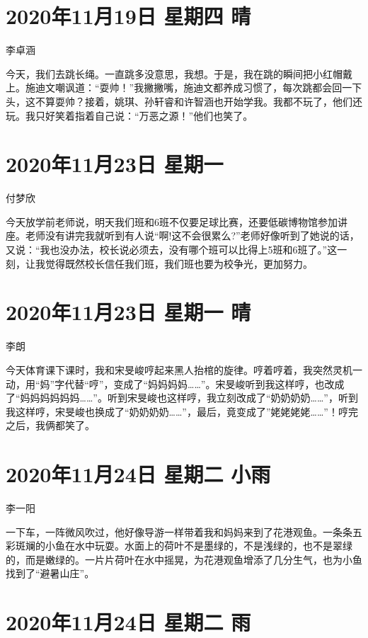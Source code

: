 \section{2020年11月19日 星期四 晴}

李卓涵

今天，我们去跳长绳。一直跳多没意思，我想。于是，我在跳的瞬间把小红帽戴上。施迪文嘲讽道：“耍帅！”我撇撇嘴，施迪文都养成习惯了，每次跳都会回一下头，这不算耍帅？接着，姚琪、孙轩睿和许智涵也开始学我。我都不玩了，他们还玩。我只好笑着指着自己说：“万恶之源！”他们也笑了。

\section{2020年11月23日 星期一}

付梦欣

今天放学前老师说，明天我们班和6班不仅要足球比赛，还要低碳博物馆参加讲座。老师没有讲完我就听到有人说“啊!这不会很累么?”老师好像听到了她说的话，又说：“我也没办法，校长说必须去，没有哪个班可以比得上5班和6班了。”这一刻，让我觉得既然校长信任我们班，我们班也要为校争光，更加努力。

\section{2020年11月23日 星期一 晴}

李朗

今天体育课下课时，我和宋旻峻哼起来黑人抬棺的旋律。哼着哼着，我突然灵机一动，用“妈”字代替“哼”，变成了“妈妈妈妈……”。宋旻峻听到我这样哼，也改成了“妈妈妈妈妈妈……”。听到宋旻峻也这样哼，我立刻改成了“奶奶奶奶……”，听到我这样哼，宋旻峻也换成了“奶奶奶奶……”，最后，竟变成了”姥姥姥姥……”！哼完之后，我俩都笑了。

\section{2020年11月24日 星期二 小雨}

李一阳

一下车，一阵微风吹过，他好像导游一样带着我和妈妈来到了花港观鱼。一条条五彩斑斓的小鱼在水中玩耍。水面上的荷叶不是墨绿的，不是浅绿的，也不是翠绿的，而是嫩绿的。一片片荷叶在水中摇晃，为花港观鱼增添了几分生气，也为小鱼找到了“避暑山庄”。

\section{2020年11月24日 星期二 雨}

